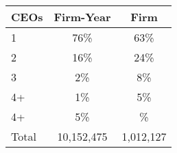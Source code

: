 \begin{tabular}{lcc}
\toprule
CEOs & Firm-Year & Firm \\
\midrule
1 & 76\% & 63\% \\
2 & 16\% & 24\% \\
3 & 2\% & 8\% \\
4+ & 1\% & 5\% \\
4+ & 5\% & \% \\
Total &   10,152,475 &    1,012,127 \\
\bottomrule
\end{tabular}
